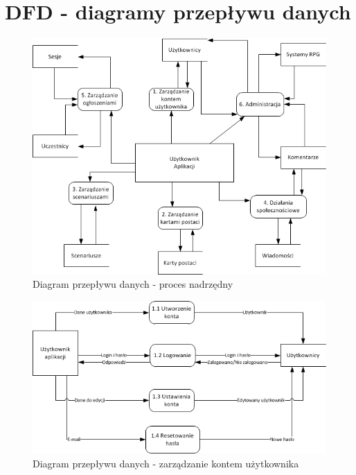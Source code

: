 
\clearpage 
\section{DFD - diagramy przepływu danych}
\label{sec:DFD}

\begin{figure}[h!]
\begin{center}
\includegraphics[scale=1]{./img/DFD-top.png}
\caption[Diagram przepływu danych]{Diagram przepływu danych - proces nadrzędny}
\label{fig:DFD-top}
\end{center}
\end{figure}

\begin{figure}[h!]
\begin{center}
\includegraphics[scale=1]{./img/DFD-user.png}
\caption[Diagram przepływu danych]{Diagram przepływu danych - zarządzanie kontem użytkownika}
\label{fig:DFD-user}
\end{center}
\end{figure}

